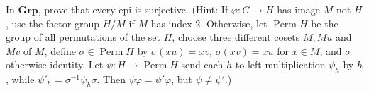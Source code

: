 In $\mathbf{Grp}$, prove that every epi is surjective. (Hint: If $\varphi: G \rightarrow H$ has image $M$ not $H$, use the factor group $H/M$ if $M$ has index 2. Otherwise, let $\operatorname{Perm} H$ be the group of all permutations of the set $H$, choose three different cosets $M, Mu$ and $Mv$ of $M$, define $\sigma \in \operatorname{Perm} H$ by $\sigma(xu) = xv$, $\sigma(xv) = xu$ for $x \in M$, and $\sigma$ otherwise identity. Let $\psi: H \rightarrow \operatorname{Perm} H$ send each $h$ to left multiplication $\psi_h$ by $h$, while $\psi'_h = \sigma^{-1}\psi_h\sigma$. Then $\psi\varphi = \psi'\varphi$, but $\psi \neq \psi'$.)